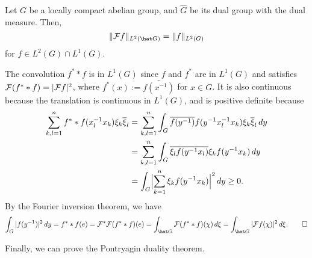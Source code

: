 \documentclass[a4paper]{article}
\begin{document}
\begin{thm}
Let $G$ be a locally compact abelian group, and $\hat G$ be its dual group with the dual measure.
Then,
\[\|\cF f\|_{L^2(\hat G)}=\|f\|_{L^2(G)}\]
for $f\in L^2(G)\cap L^1(G)$.
\end{thm}
\begin{pf}
The convolution $f^**f$ is in $L^1(G)$ since $f$ and $f^*$ are in $L^1(G)$ and satisfies $\cF(f^**f)=|\cF f|^2$, where $f^*(x):=\bar{f(x^{-1})}$ for $x\in G$.
It is also continuous because the translation is continuous in $L^1(G)$, and is positive definite because
\begin{align*}
\sum_{k,l=1}^nf^**f(x_l^{-1}x_k)\xi_k\bar\xi_l
&=\sum_{k,l=1}^n\int_G\bar{f(y^{-1})}f(y^{-1}x_l^{-1}x_k)\xi_k\bar\xi_l\,dy\\
&=\sum_{k,l=1}^n\int_G\bar{\xi_lf(y^{-1}x_l)}\xi_kf(y^{-1}x_k)\,dy\\
&=\int_G\Bigl|\sum_{k=1}^n\xi_kf(y^{-1}x_k)\Bigr|^2\,dy\ge0.
\end{align*}
By the Fourier inversion theorem, we have
\[\int_G|f(y^{-1})|^2\,dy=f^**f(e)=\cF^*\cF(f^**f)(e)=\int_{\hat G}\cF(f^**f)(\chi)\,d\xi=\int_{\hat G}|\cF f(\chi)|^2\,d\xi.\qedhere\]
\end{pf}

Finally, we can prove the Pontryagin duality theorem.
\end{document}
